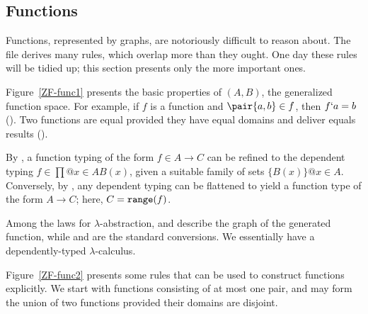\subsection{Functions}
Functions, represented by graphs, are notoriously difficult to reason
about.  The file  derives many rules, which overlap
more than they ought.  One day these rules will be tidied up; this section
presents only the more important ones.

Figure~\ref{ZF-func1} presents the basic properties of $(A,B)$,
the generalized function space.  For example, if $f$ is a function and
$\pair{a,b}\in f$, then $f`a=b$ ().  Two functions
are equal provided they have equal domains and deliver equals results
().

By , a function typing of the form $f\in A\to C$ can be
refined to the dependent typing $f\in\prod@{x\in A}B(x)$, given a suitable
family of sets $\{B(x)\}@{x\in A}$.  Conversely, by ,
any dependent typing can be flattened to yield a function type of the form
$A\to C$; here, $C={\tt range}(f)$.

Among the laws for $\lambda$-abstraction,  and 
describe the graph of the generated function, while  and
 are the standard conversions.  We essentially have a
dependently-typed $\lambda$-calculus.

Figure~\ref{ZF-func2} presents some rules that can be used to construct
functions explicitly.  We start with functions consisting of at most one
pair, and may form the union of two functions provided their domains are
disjoint.  


